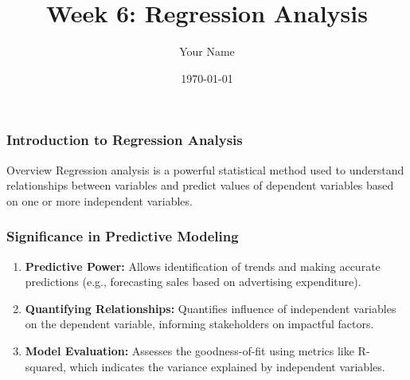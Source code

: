 \documentclass{beamer}
\title{Week 6: Regression Analysis}
\author{Your Name}
\institute{Your Institution}
\date{\today}
\begin{document}
\frame{\titlepage}

\begin{frame}[fragile]
    \frametitle{Introduction to Regression Analysis}
    \begin{block}{Overview}
        Regression analysis is a powerful statistical method used to understand relationships between variables and predict values of dependent variables based on one or more independent variables.
    \end{block}
\end{frame}

\begin{frame}[fragile]
    \frametitle{Significance in Predictive Modeling}
    \begin{enumerate}
        \item \textbf{Predictive Power:} Allows identification of trends and making accurate predictions (e.g., forecasting sales based on advertising expenditure).
        \item \textbf{Quantifying Relationships:} Quantifies influence of independent variables on the dependent variable, informing stakeholders on impactful factors.
        \item \textbf{Model Evaluation:} Assesses the goodness-of-fit using metrics like R-squared, which indicates the variance explained by independent variables.
    \end{enumerate}
\end{frame}
\end{document}

